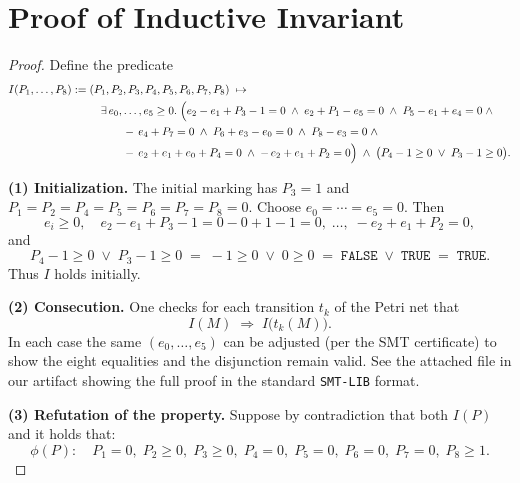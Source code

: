
\section{Proof of Inductive Invariant}
\label{appendix:InductiveInvariantExample}


\begin{proof}
	
Define the predicate
\[
\begin{aligned}
	I(P_{1},\dots,P_{8})
	:={}&
		(P_{1},\textcolor{black}{P_{2}},\textcolor{black}{P_{3}},P_{4},P_{5},P_{6},\textcolor{black}{P_{7}},\textcolor{black}{P_{8}})
		\;\mapsto\;\\
		&\quad
		\exists\,e_{0},\dots,e_{5}\ge0.\;
		\Bigl(
		e_{2}-e_{1}+\textcolor{black}{P_{3}}-1=0\;\land\;
		e_{2}+P_{1}-e_{5}=0\;\land\;
		P_{5}-e_{1}+e_{4}=0\;\land\\
		&\qquad\quad
		-\,e_{4}+\textcolor{black}{P_{7}}=0\;\land\;
		P_{6}+e_{3}-e_{0}=0\;\land\;
		\textcolor{black}{P_{8}}-e_{3}=0\;\land\\
		&\qquad\quad
		-\,e_{2}+e_{1}+e_{0}+P_{4}=0\;\land\;
		-\,e_{2}+e_{1}+\textcolor{black}{P_{2}}=0
		\Bigr)
		\;\land\;
		\bigl(P_{4}-1\ge0\;\lor\;\textcolor{black}{P_{3}}-1\ge0\bigr).
	\end{aligned}
	\]
	
	
	\medskip\noindent
	\textbf{(1) Initialization.}
	The initial marking has $P_{3}=1$ and $P_{1}=P_{2}=P_{4}=P_{5}=P_{6}=P_{7}=P_{8}=0$.
	Choose $e_{0}=\cdots=e_{5}=0$.  Then
	\[
	e_{i}\ge0,\quad
	e_{2}-e_{1}+P_{3}-1=0-0+1-1=0,\;\dots,\;-e_{2}+e_{1}+P_{2}=0,
	\]
	and 
	\[
	P_{4}-1\ge0\;\lor\;P_{3}-1\ge0
	\;=\;-1\ge0\;\lor\;0\ge0
	\;=\;\texttt{FALSE}\;\lor\;\texttt{TRUE}
	\;=\;\texttt{TRUE}.
	\]
	Thus $I$ holds initially.
	
	\medskip\noindent
	\textbf{(2) Consecution.}
	One checks for each transition $t_{k}$ of the Petri net that
	\[
	I(M)\;\Longrightarrow\;I\bigl(t_{k}(M)\bigr).
	\]
	In each case the same $(e_{0},\dots,e_{5})$ can be adjusted (per the SMT certificate) to show the eight equalities and the disjunction remain valid. See the attached file in our artifact showing the full proof in the standard \texttt{SMT-LIB} format.
	
	\medskip\noindent
	\textbf{(3) Refutation of the property.}
	Suppose by contradiction that both $I(P)$ and it holds that:
	\[
	\phi(P):\quad
	P_{1}=0,\;
	P_{2}\ge0,\;
	P_{3}\ge0,\;
	P_{4}=0,\;
	P_{5}=0,\;
	P_{6}=0,\;
	P_{7}=0,\;
	P_{8}\ge1.
	\] 
	

\end{proof}
